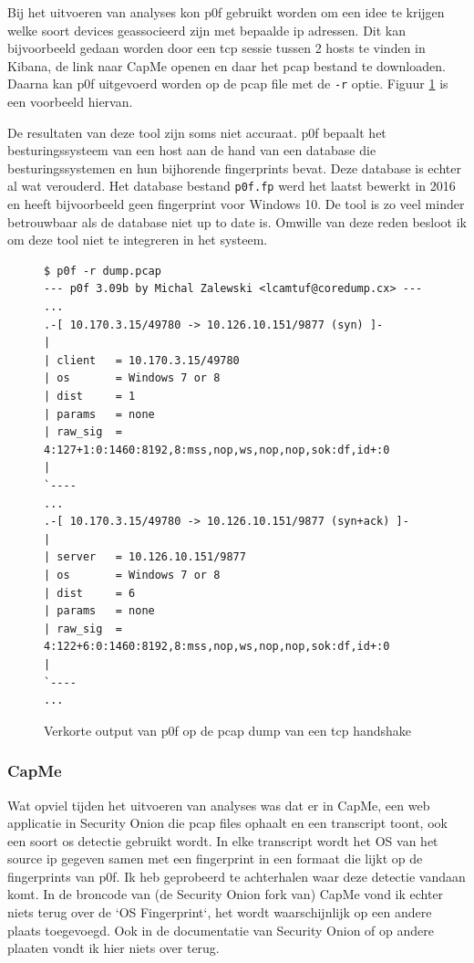 \documentclass[a4paper,12pt]{report}
\begin{document}
Bij het uitvoeren van analyses kon p0f gebruikt worden om een idee te krijgen welke soort devices geassocieerd zijn met bepaalde ip adressen.
Dit kan bijvoorbeeld gedaan worden door een tcp sessie tussen 2 hosts te vinden in Kibana, de link naar CapMe openen en daar het pcap bestand te downloaden.
Daarna kan p0f uitgevoerd worden op de pcap file met de \lstinline|-r| optie.
Figuur \ref{fig:p0f-so-voorbeeld} is een voorbeeld hiervan.

De resultaten van deze tool zijn soms niet accuraat.
p0f bepaalt het besturingssysteem van een host aan de hand van een database die besturingssystemen en hun bijhorende fingerprints bevat.
Deze database is echter al wat verouderd.
Het database bestand \lstinline|p0f.fp| werd het laatst bewerkt in 2016 en heeft bijvoorbeeld geen fingerprint voor Windows 10.
De tool is zo veel minder betrouwbaar als de database niet up to date is.
Omwille van deze reden besloot ik om deze tool niet te integreren in het systeem.

\begin{figure}[H]
  \begin{lstlisting}
$ p0f -r dump.pcap                                           
--- p0f 3.09b by Michal Zalewski <lcamtuf@coredump.cx> ---
...
.-[ 10.170.3.15/49780 -> 10.126.10.151/9877 (syn) ]-
|
| client   = 10.170.3.15/49780
| os       = Windows 7 or 8
| dist     = 1
| params   = none
| raw_sig  = 4:127+1:0:1460:8192,8:mss,nop,ws,nop,nop,sok:df,id+:0
|
`----
...
.-[ 10.170.3.15/49780 -> 10.126.10.151/9877 (syn+ack) ]-
|
| server   = 10.126.10.151/9877
| os       = Windows 7 or 8
| dist     = 6
| params   = none
| raw_sig  = 4:122+6:0:1460:8192,8:mss,nop,ws,nop,nop,sok:df,id+:0
|
`----
...
  \end{lstlisting}
  \caption{Verkorte output van p0f op de pcap dump van een tcp handshake}
  \label{fig:p0f-so-voorbeeld}
\end{figure}

\subsubsection{CapMe}
Wat opviel tijden het uitvoeren van analyses was dat er in CapMe, een web applicatie in Security Onion die pcap files ophaalt en een transcript toont, ook een soort os detectie gebruikt wordt.
In elke transcript wordt het OS van het source ip gegeven samen met een fingerprint in een formaat die lijkt op de fingerprints van p0f.
Ik heb geprobeerd te achterhalen waar deze detectie vandaan komt.
In de broncode van (de Security Onion fork van) CapMe vond ik echter niets terug over de `OS Fingerprint`, het wordt waarschijnlijk op een andere plaats toegevoegd.
Ook in de documentatie van Security Onion of op andere plaaten vondt ik hier niets over terug.
\end{document}

